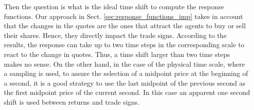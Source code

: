 Then the question is what is the ideal time shift to compute the response
functions. Our approach in Sect. \ref{sec:response_functions_imp} takes in
account that the changes in the quotes are the ones that attract the agents to
buy or sell their shares. Hence, they directly impact the trade signs.
According to the results, the response can take up to two time steps in the
corresponding scale to react to the change in quotes. Thus, a time shift
larger than two time steps makes no sense.
On the other hand, in the case of the physical time scale, where a sampling is
used, to assure the selection of a midpoint price at the beginning of a second,
it is a good strategy to use the last midpoint of the previous second as the
first midpoint price of the current second. In this case an apparent one second
shift is used between returns and trade signs.